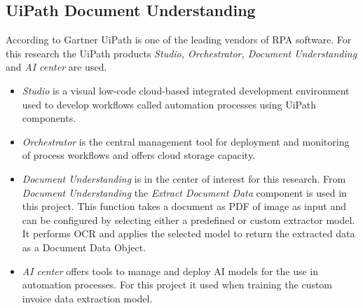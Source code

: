 \subsection{UiPath Document Understanding}
According to Gartner \cite{gartner2023magicquadrant} UiPath is one of the leading vendors of \acl{RPA} software. For this research the UiPath products \textit{Studio, Orchestrator, Document Understanding} and \textit{AI center} are used. 
\begin{itemize}
    \item \textit{Studio} is a visual low-code cloud-based integrated development environment used to develop workflows called automation processes using UiPath components. 
    \item \textit{Orchestrator} is the central management tool for deployment and monitoring of process workflows and offers cloud storage capacity. 
    \item \textit{Document Understanding} is in the center of interest for this research. From \textit{Document Understanding} the \textit{Extract Document Data} component is used in this project. This function takes a document as PDF of image as input and can be configured by selecting either a predefined or custom extractor model. It performs \ac{OCR} and applies the selected model to return the extracted data as a Document Data Object.
    \item \textit{AI center} offers tools to manage and deploy \ac{AI} models for the use in automation processes. For this project it used when training the custom invoice data extraction model. \cite{uipath}

\end{itemize}
